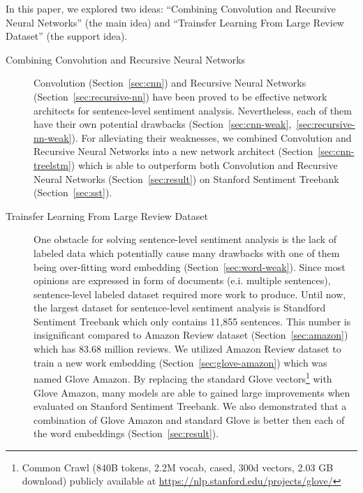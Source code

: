 In this paper, we explored two ideas: ``Combining Convolution and Recursive Neural Networks'' (the main idea) and ``Trainsfer Learning From Large Review Dataset'' (the support idea).
\begin{description}
	\item[Combining Convolution and Recursive Neural Networks] Convolution (Section~\ref{sec:cnn}) and Recursive Neural Networks (Section~\ref{sec:recursive-nn}) have been proved to be effective network architects for sentence-level sentiment analysis.
	Nevertheless, each of them have their own potential drawbacks (Section~\ref{sec:cnn-weak},~\ref{sec:recursive-nn-weak}).
	For alleviating their weaknesses, we combined Convolution and Recursive Neural Networks into a new network architect (Section~\ref{sec:cnn-treelstm}) which is able to outperform both Convolution and Recursive Neural Networks (Section~\ref{sec:result}) on Stanford Sentiment Treebank (Section~\ref{sec:sst}).
	\item[Trainsfer Learning From Large Review Dataset] One obstacle for solving sentence-level sentiment analysis is the lack of labeled data which potentially cause many drawbacks with one of them being over-fitting word embedding (Section~\ref{sec:word-weak}).
	Since most opinions are expressed in form of  documents (e.i. multiple sentences), sentence-level labeled dataset required more work to produce.
	Until now, the largest dataset for sentence-level sentiment analysis is Standford Sentiment Treebank which only contains 11,855 sentences.
	This number is insignificant compared to Amazon Review dataset (Section~\ref{sec:amazon}) which has 83.68 million reviews.
	We utilized Amazon Review dataset to train a new work embedding (Section~\ref{sec:glove-amazon}) which was named Glove Amazon.
	By replacing the standard Glove vectors\footnote{Common Crawl (840B tokens, 2.2M vocab, cased, 300d vectors, 2.03 GB download) publicly available at \url{https://nlp.stanford.edu/projects/glove/}} with Glove Amazon, many models are able to gained large improvements when evaluated on Stanford Sentiment Treebank.
	We also demonstrated that a combination of Glove Amazon and standard Glove is better then each of the word embeddings (Section~\ref{sec:result}).
\end{description}

